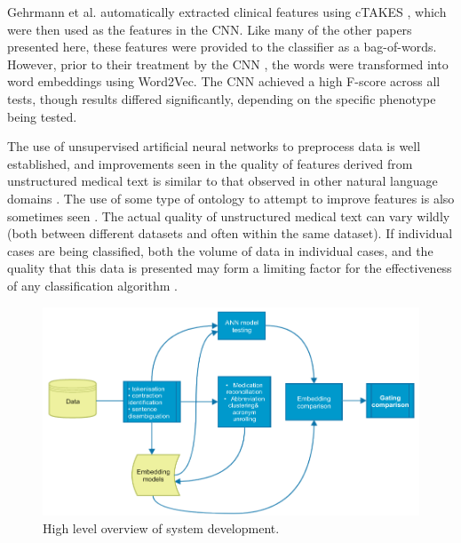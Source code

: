 Gehrmann et al. automatically extracted clinical features using cTAKES \cite{gehrmann2018comparing}, which were then used as the features in the CNN. Like many of the other papers presented here, these features were provided to the classifier as a bag-of-words. However, prior to their treatment by the CNN , the words were transformed into word embeddings using Word2Vec. The CNN  achieved a high F-score across all tests, though results differed significantly, depending on the specific phenotype being tested. 


The use of unsupervised artificial neural networks to preprocess data is well established, and improvements seen in the quality of features derived from unstructured medical text is similar to that observed in other natural language domains \cite{miotto2016deep}. The use of some type of ontology to attempt to improve features is also sometimes seen \cite{gehrmann2018comparing}. The actual quality of unstructured medical text can vary wildly (both between different datasets and often within the same dataset). If individual cases are being classified, both the volume of data in individual cases, and the quality that this data is presented may form a limiting factor for the effectiveness of any classification algorithm \cite{yao2016convolutional} .

\begin{figure}[htbp]
   \begin{center}

 \includegraphics[width=1.0\textwidth]{Figs/scheme-development-plan-.pdf} 

 \caption{High level overview of system development.}
 \label{fig:development-plan}
  \end{center}
\end{figure}


